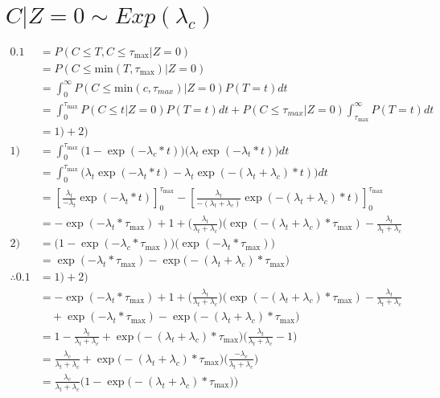 \documentclass[10pt, letter]{article}
\begin{document}
\section{$C|Z=0 \sim Exp(\lambda_c)$}
\begin{align*}
0.1 &= P(C \leqslant T, C \leqslant \tau_\mathrm{max} | Z=0)\\
&= P(C \leqslant \mathrm{min}(T, \tau_\mathrm{max}) | Z=0) \\
&= \int_0^\infty P(C \leqslant \mathrm{min}(c, \tau_{max}) | Z=0) P(T=t) dt\\
&= \int_0^{\tau_\mathrm{max}} P(C \leqslant t | Z=0) P(T=t) dt +  P(C \leqslant \tau_{max}| Z=0) \int_{\tau_{\mathrm{max}}}^\infty P(T=t)dt\\
&= 1) + 2)\\
1) &= \int_0^{\tau_{\mathrm{max}}} \big( 1 - \exp(-\lambda_c * t)\big) \big(\lambda_t \exp(-\lambda_t * t)\big)dt\\
&= \int_0^{\tau_{\mathrm{max}}} \Big( \lambda_t \exp(-\lambda_t * t) - \lambda_t \exp(-(\lambda_t + \lambda_c)*t) \Big) dt\\
&= \left[ \frac{\lambda_t}{-\lambda_t} \exp(-\lambda_t * t)\right]_0^{\tau_\mathrm{max}} - \left[\frac{\lambda_t}{-(\lambda_t + \lambda_c)} \exp(-(\lambda_t + \lambda_c )*t)\right]_0^{\tau_\mathrm{max}}\\
&= -\exp(-\lambda_t * \tau_\mathrm{max}) + 1+ \Big(\frac{\lambda_t}{\lambda_t + \lambda_c}\Big)\Big(\exp(-(\lambda_t+\lambda_c)*\tau_\mathrm{max}) - \frac{\lambda_t}{\lambda_t + \lambda_c}\\
2) &= \Big(1-\exp(-\lambda_c*\tau_\mathrm{max})\Big)\Big(\exp(-\lambda_t*\tau_\mathrm{max})\Big)\\
&= \exp(-\lambda_t*\tau_\mathrm{max}) - \exp\big(-(\lambda_t + \lambda_c)*\tau_\mathrm{max}\big)\\
\therefore 0.1 &= 1) + 2)\\
&=  -\exp(-\lambda_t * \tau_\mathrm{max}) + 1+ \Big(\frac{\lambda_t}{\lambda_t + \lambda_c}\Big)\Big(\exp(-(\lambda_t+\lambda_c)*\tau_\mathrm{max}) - \frac{\lambda_t}{\lambda_t + \lambda_c}\\
&\quad + \exp(-\lambda_t*\tau_\mathrm{max}) - \exp\big(-(\lambda_t + \lambda_c)*\tau_\mathrm{max}\big)\\
&= 1 - \frac{\lambda_t}{\lambda_t + \lambda_c} + \exp\big(-(\lambda_t + \lambda_c)*\tau_\mathrm{max}\big)\big( \frac{\lambda_t}{\lambda_t + \lambda_c} - 1\big)\\
&= \frac{\lambda_c}{\lambda_t + \lambda_c} +  \exp\big(-(\lambda_t + \lambda_c)*\tau_\mathrm{max}\big)\Big(\frac{-\lambda_c}{\lambda_t + \lambda_c}\Big)\\
&= \frac{\lambda_c}{\lambda_t + \lambda_c} \Big( 1 - \exp\big(-(\lambda_t + \lambda_c)*\tau_\mathrm{max}\big)\Big)\\
\end{align*}
\end{document}
